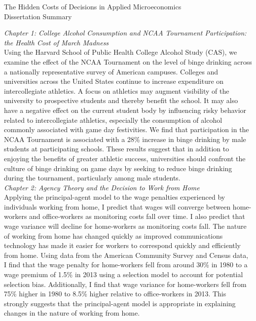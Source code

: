 \documentclass[margin]{res}  %
\begin{document}
\begin{adjustwidth}{-5em}{5em}
\begin{large}
\begin{center}

The Hidden Costs of Decisions in Applied Microeconomics \\
Dissertation Summary\\[2em]

\end{center}
\end{large}
\textit{Chapter 1: College Alcohol Consumption and NCAA Tournament Participation: the Health Cost of March Madness}\\

Using the Harvard School of Public Health College Alcohol Study (CAS), we examine the effect of the NCAA Tournament on the level of binge drinking across a nationally representative survey of American campuses. Colleges and universities across the United States continue to increase expenditure on intercollegiate athletics. A focus on athletics may augment visibility of the university to prospective students and thereby benefit the school. It may also have a negative effect on the current student body by influencing risky behavior related to intercollegiate athletics, especially the consumption of alcohol commonly associated with game day festivities. We find that participation in the NCAA Tournament is associated with a 28\% increase in binge drinking by male students at participating schools. These results suggest that in addition to enjoying the benefits of greater athletic success, universities should confront the culture of binge drinking on game days by seeking to reduce binge drinking during the tournament, particularly among male students.\\

\textit{Chapter 2: Agency Theory and the Decision to Work from Home}\\

Applying the principal-agent model to the wage penalties experienced by individuals working from home, I predict that wages will converge between home-workers and office-workers as monitoring costs fall over time. I also predict that wage variance will decline for home-workers as monitoring costs fall. The nature of working from home has changed quickly as improved communications technology has made it easier for workers to correspond quickly and efficiently from home. Using data from the American Community Survey and Census data, I find that the wage penalty for home-workers fell from around 30\% in 1980 to a wage premium of 1.5\% in 2013 using a selection model to account for potential selection bias. Additionally, I find that wage variance for home-workers fell from 75\% higher in 1980 to 8.5\% higher relative to office-workers in 2013. This strongly suggests that the principal-agent model is appropriate in explaining changes in the nature of working from home.\\[3em]


\end{adjustwidth}
\end{document}
